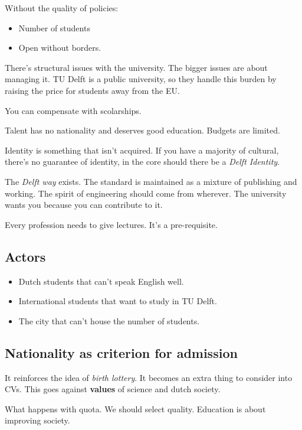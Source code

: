	Without the quality of policies:
	\begin{itemize}
		\item Number of students
		\item Open without borders.
	\end{itemize}


	There's structural issues with the university.
		The bigger issues are about managing it. TU Delft is a public university, so they handle this burden by raising the price for students away from the EU.

			You can compensate with scolarships.

		Talent has no nationality and deserves good education. Budgets are limited.
		
		Identity is something that isn't acquired. If you have a majority of cultural, there's no guarantee of identity, in the core should there be a \textit{Delft Identity}.

		The \textit{Delft way} exists. The standard is maintained as a mixture of publishing and working. The spirit of engineering should come from wherever. The university wants you because you can contribute to it.

		Every profession needs to give lectures. It's a pre-requisite.


	\subsection{Actors}
	
	\begin{itemize}
		\item Dutch students that can't speak English well.
		\item International students that want to study in TU Delft.
		\item The city that can't house the number of students.
	\end{itemize}
			

	\subsection{Nationality as criterion for admission}

		It  reinforces the idea of \textit{birth lottery}. 
		It becomes an extra thing to consider into CVs. This goes against \textbf{values} of science and dutch society.

		What happens with quota. We should select quality. Education is about improving society.

